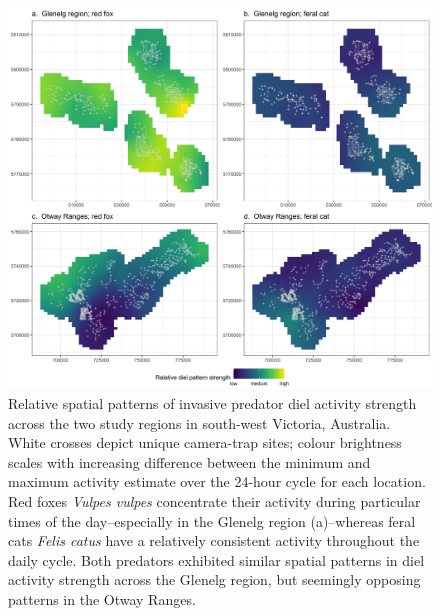 \documentclass[]{elsarticle} %
\begin{document}
\begin{figure}
\includegraphics[width=1\linewidth]{../figs/diel_strength_600dpi} \caption{Relative spatial patterns of invasive predator diel activity strength across the two study regions in south-west Victoria, Australia. White crosses depict unique camera-trap sites; colour brightness scales with increasing difference between the minimum and maximum activity estimate over the 24-hour cycle for each location. Red foxes \textit{Vulpes vulpes} concentrate their activity during particular times of the day--especially in the Glenelg region (a)--whereas feral cats \textit{Felis catus} have a relatively consistent activity throughout the daily cycle. Both predators exhibited similar spatial patterns in diel activity strength across the Glenelg region, but seemingly opposing patterns in the Otway Ranges.}\label{fig:space}
\end{figure}

\newpage
\end{document}
